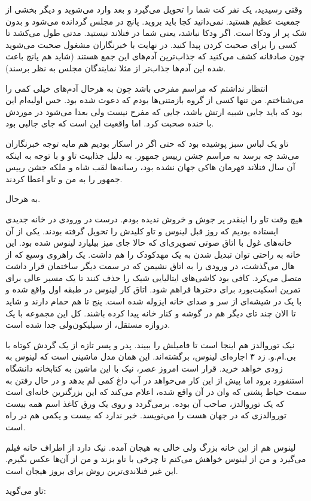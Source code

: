 وقتی رسیدید، یک نفر کت شما را تحویل می‌گیرد و بعد وارد می‌شوید و دیگر
بخشی از جمعیت عظیم هستید. نمی‌دانید کجا باید بروید.
پانچ
در مجلس گردانده می‌شود و بدون شک پر از ودکا است. اگر ودکا نباشد، یعنی
شما در فنلاند نیستید. مدتی طول می‌کشد تا کسی را برای صحبت کردن پیدا
کنید. در نهایت با خبرنگاران مشغول صحبت می‌شوید چون صادقانه کشف می‌کنید
که جذاب‌‌ترین آدم‌های این جمع هستند (شاید هم پانچ باعث شده این آدم‌ها
جذاب‌تر از مثلا نمایندگان مجلس به نظر برسند).

انتظار نداشتم که مراسم مفرحی باشد چون به هرحال آدم‌های خیلی کمی را
می‌شناختم. من تنها کسی از گروه بازمتنی‌ها بودم که دعوت شده بود. حس
اولیه‌ام این بود که باید جایی شبیه ارتش باشد،‌ جایی که مفرح نیست ولی
بعدا می‌شود در موردش با خنده صحبت کرد. اما واقعیت این است که جای جالبی
بود.

تاو یک لباس سبز پوشیده بود که حتی اگر در اسکار بودیم هم مایه توجه
خبرنگاران می‌شد چه برسد به مراسم جشن رییس جمهور. به دلیل جذابیت تاو و
با توجه به اینکه آن سال فنلاند قهرمان هاکی جهان نشده بود، رسانه‌ها لقب
شاه و ملکه جشن رییس جمهور را به من و تاو اعطا کردند.

به هرحال. 

\begin{journal}

هیچ وقت تاو را اینقدر پر جوش و خروش ندیده بودم. درست در ورودی در خانه
جدیدی ایستاده بودیم که روز قبل لینوس و تاو کلیدش را تحویل گرفته
بودند. یکی از آن خانه‌های غول با اتاق صوتی تصویری‌ای که حالا جای میز
بیلیارد لینوس شده بود. این خانه به راحتی توان تبدیل شدن به یک مهدکودک
را هم داشت. یک راهروی وسیع که از هال می‌گذشت، در ورودی را به اتاق نشیمن
که در سمت دیگر ساختمان قرار داشت متصل می‌کرد. کافی بود کاشی‌های
ایتالیایی شیک را حذف کنند تا یک مسیر عالی برای تمرین اسکیت‌بورد برای
دخترها فراهم شود. اتاق کار لینوس در طبقه اول واقع شده و با یک در
شیشه‌ای از سر و صدای خانه ایزوله شده است. پنج تا هم حمام دارند و شاید
تا الان چند تای دیگر هم در گوشه‌ و کنار خانه پیدا کرده باشند. کل این
مجموعه با یک دروازه مستقل، از سیلیکون‌ولی جدا شده است.

نیک توروالدز هم اینجا است تا فامیلش را ببیند. پدر و پسر تازه از یک
گردش کوتاه با بی.ام.و. زد ۳ اجاره‌ای لینوس، برگشته‌اند. این همان مدل
ماشینی است که لینوس به زودی خواهد خرید. قرار است امروز عصر، نیک با این
ماشین به کتابخانه دانشگاه استنفورد برود اما پیش از این کار می‌خواهد در
آب داغ کمی لم بدهد و در حال رفتن به سمت حیاط پشتی که وان در آن واقع
شده، اعلام می‌کند که این بزرگترین خانه‌ای است که یک توروالدز، صاحب آن
بوده. برمی‌گردد و روی یک ورق کاغذ اسم همه بیست توروالدزی که در جهان هست
را می‌نویسد. خبر ندارد که بیست و یکمی هم در راه است.

لینوس هم از این خانه بزرگ ولی خالی به هیجان آمده. نیک دارد از اطراف
خانه فیلم می‌گیرد و من از لینوس خواهش می‌کنم تا چرخی با تاو بزند و من از
آن‌ها عکس بگیرم. این غیر فنلاندی‌ترین روش برای بروز هیجان است.

تاو می‌گوید: 
\end{journal}

